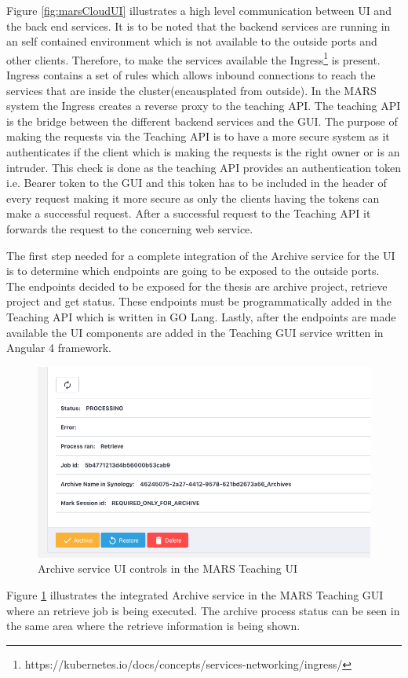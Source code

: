 Figure \ref{fig:marsCloudUI} illustrates a high level communication between UI and the back end services. It is to be noted that the backend services
are running in an self contained environment which is not available to the outside ports and other clients. Therefore, 
to make the services available the Ingress\footnote{https://kubernetes.io/docs/concepts/services-networking/ingress/} is present. Ingress contains
a set of rules which allows inbound connections to reach the services that are inside the cluster(encausplated from outside). In the MARS system
the Ingress creates a reverse proxy to the teaching API. The teaching API is the bridge between the different backend services and the GUI. The purpose
of making the requests via the Teaching API is to have a more secure system as it authenticates if the client which is making the requests is the right owner or 
is an intruder. This check is done as the teaching API provides an authentication token i.e. Bearer token to the GUI and this token has to be included in the
header of every request making it more secure as only the clients having the tokens can make a successful request. After a successful request to the Teaching API
it forwards the request to the concerning web service.


The first step needed for a complete integration of the Archive service for the UI is to determine which endpoints are going to be exposed to the outside ports.
The endpoints decided to be exposed for the thesis are archive project, retrieve project and get status. These endpoints must be programmatically added
in the Teaching API which is written in GO Lang. Lastly, after the endpoints are made available the UI components are added in the Teaching GUI service
written in Angular 4 framework. 

\begin{figure}[H]
    \centering \includegraphics[scale=0.5]{grafiken/archiveUI.png}
    \caption{Archive service UI controls in the MARS Teaching UI}
    \label{fig:archiveUI}
\end{figure}

Figure \ref{fig:archiveUI} illustrates the integrated Archive service in the MARS Teaching GUI where an retrieve job is being executed. The archive process
status can be seen in the same area where the retrieve information is being shown.
